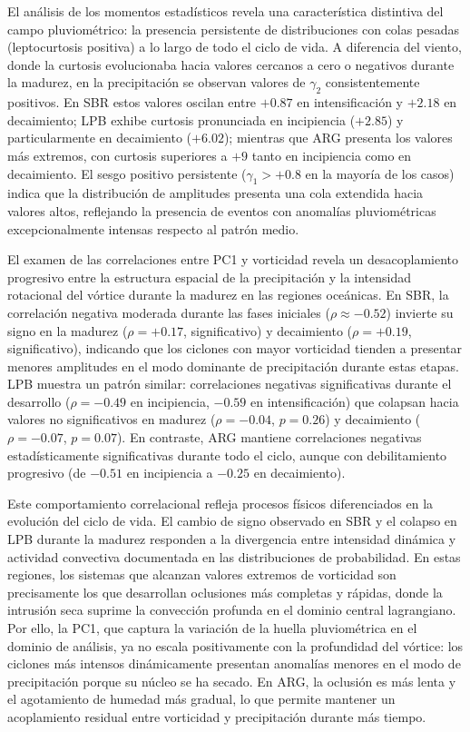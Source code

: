 El análisis de los momentos estadísticos revela una característica distintiva del campo pluviométrico: la presencia persistente de distribuciones con colas pesadas (leptocurtosis positiva) a lo largo de todo el ciclo de vida.
A diferencia del viento, donde la curtosis evolucionaba hacia valores cercanos a cero o negativos durante la madurez, en la precipitación se observan valores de $\gamma_2$ consistentemente positivos. 
En SBR estos valores oscilan entre $+0.87$ en intensificación y $+2.18$ en decaimiento; LPB exhibe curtosis pronunciada en incipiencia ($+2.85$) y particularmente en decaimiento ($+6.02$); mientras que ARG presenta los valores más extremos, con curtosis superiores a $+9$ tanto en incipiencia como en decaimiento. 
El sesgo positivo persistente ($\gamma_1 > +0.8$ en la mayoría de los casos) indica que la distribución de amplitudes presenta una cola extendida hacia valores altos, reflejando la presencia de eventos con anomalías pluviométricas excepcionalmente intensas respecto al patrón medio.

El examen de las correlaciones entre PC1 y vorticidad revela un desacoplamiento progresivo entre la estructura espacial de la precipitación y la intensidad rotacional del vórtice durante la madurez en las regiones oceánicas. 
En SBR, la correlación negativa moderada durante las fases iniciales ($\rho \approx -0.52$) invierte su signo en la madurez ($\rho = +0.17$, significativo) y decaimiento ($\rho = +0.19$, significativo), indicando que los ciclones con mayor vorticidad tienden a presentar menores amplitudes en el modo dominante de precipitación durante estas etapas. 
LPB muestra un patrón similar: correlaciones negativas significativas durante el desarrollo ($\rho = -0.49$ en incipiencia, $-0.59$ en intensificación) que colapsan hacia valores no significativos en madurez ($\rho = -0.04$, $p = 0.26$) y decaimiento ($\rho = -0.07$, $p = 0.07$). 
En contraste, ARG mantiene correlaciones negativas estadísticamente significativas durante todo el ciclo, aunque con debilitamiento progresivo (de $-0.51$ en incipiencia a $-0.25$ en decaimiento).

Este comportamiento correlacional refleja procesos físicos diferenciados en la evolución del ciclo de vida. 
El cambio de signo observado en SBR y el colapso en LPB durante la madurez responden a la divergencia entre intensidad dinámica y actividad convectiva documentada en las distribuciones de probabilidad. 
En estas regiones, los sistemas que alcanzan valores extremos de vorticidad son precisamente los que desarrollan oclusiones más completas y rápidas, donde la intrusión seca suprime la convección profunda en el dominio central lagrangiano. 
Por ello, la PC1, que captura la variación de la huella pluviométrica en el dominio de análisis, ya no escala positivamente con la profundidad del vórtice: los ciclones más intensos dinámicamente presentan anomalías menores en el modo de precipitación porque su núcleo se ha secado. 
En ARG, la oclusión es más lenta y el agotamiento de humedad más gradual, lo que permite mantener un acoplamiento residual entre vorticidad y precipitación durante más tiempo.

